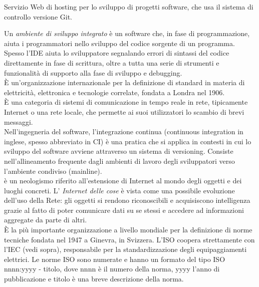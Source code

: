 \documentclass{scalatekids-article}
\begin{document}
 Servizio Web di hosting per lo sviluppo di progetti software, che usa il sistema di controllo  versione Git.
\\



 Un \textit{ambiente di sviluppo integrato} è un software che, in fase di programmazione, aiuta i programmatori nello sviluppo del codice sorgente di un programma. Spesso l'IDE aiuta lo sviluppatore segnalando errori di sintassi del codice direttamente in fase di scrittura, oltre a tutta una serie di strumenti e funzionalità di supporto alla fase di sviluppo e debugging.
\\

 È un'organizzazione internazionale per la definizione di standard in materia di elettricità, elettronica e tecnologie correlate, fondata a Londra nel 1906.
\\

 È una categoria di sistemi di comunicazione in tempo reale in rete, tipicamente Internet o una rete locale, che permette ai suoi utilizzatori lo scambio di brevi messaggi.
\\

 Nell'ingegneria del software, l'integrazione continua (continuous integration in inglese, spesso abbreviato in CI) è una pratica che si applica in contesti in cui lo sviluppo del software avviene attraverso un sistema di versioning. Consiste nell'allineamento frequente dagli ambienti di lavoro degli sviluppatori verso l'ambiente condiviso (mainline).
\\

 è un neologismo riferito all'estensione di Internet al mondo degli oggetti e dei luoghi concreti.
L' \textit{Internet delle cose} è vista come una possibile evoluzione dell'uso della Rete: gli oggetti si rendono riconoscibili e acquisiscono intelligenza grazie al fatto di poter comunicare dati su se stessi e accedere ad informazioni aggregate da parte di altri.
\\

   È la più importante organizzazione a livello mondiale per la definizione di norme tecniche fondata nel 1947 a Ginevra, in Svizzera.
  L'ISO coopera strettamente con l'IEC (vedi sopra), responsabile per la standardizzazione degli equipaggiamenti elettrici.
  Le norme ISO sono numerate e hanno un formato del tipo ISO nnnn:yyyy - titolo, dove nnnn è il numero della norma, yyyy l'anno di pubblicazione e titolo è una breve descrizione della norma.
  \\
  
\end{document}
